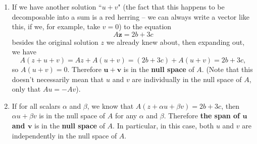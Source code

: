 \documentclass[11pt]{article}
\begin{document}
\begin{enumerate}
\begin{enumerate}
\item If we have another solution ``$u+v$" (the fact that this happens to be decomposable into a sum is a red herring -- we can always write a vector like this, if we, for example, take $v = 0$) to the equation
\[A \mathbf{z} = 2b + 3c \]
besides the original solution $z$ we already knew about, then expanding out, we have
\[A(z + u + v) = Az + A(u+v) = (2b + 3c) + A(u+v) = 2b + 3c,\]
so $A(u+v) = 0$.  Therefore $\mathbf{u+v}$ is in the \textbf{null space} of $A$. (Note that this doesn't necessarily mean that $u$ and $v$ are individually in  the null space of $A$, only that $Au = -Av$).

\item If for all scalars $\alpha$ and $\beta$, we know that $A(z + \alpha u + \beta v) = 2b + 3c$, then $\alpha u + \beta v$ is in the null space of $A$ for any $\alpha$ and $\beta$.  Therefore \textbf{the span of $\mathbf{u}$ and $\mathbf{v}$} is in the \textbf{null space} of $A$.  In particular, in this case, both $u$ and $v$ are independently in the null space of $A$.

\end{enumerate}









\end{enumerate}
\end{document}
